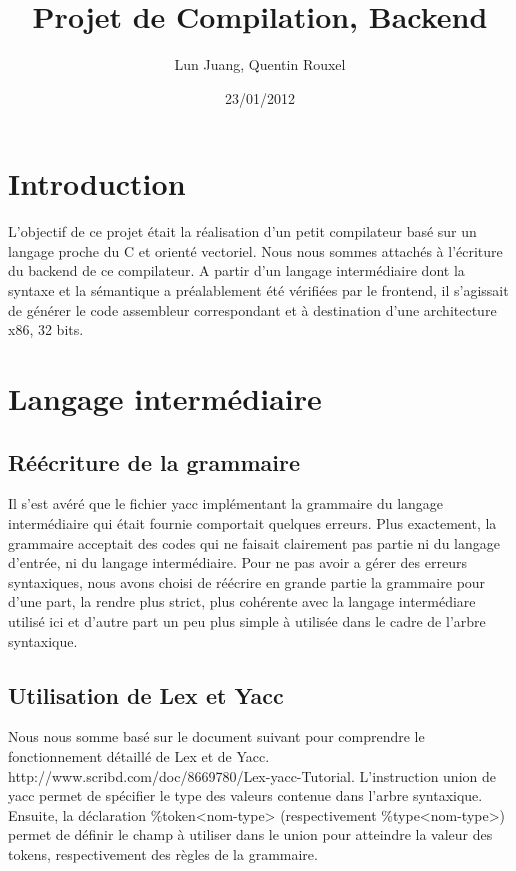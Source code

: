 \documentclass[a4paper, 11pt]{article}
\title{Projet de Compilation, Backend}
\author{Lun Juang, Quentin Rouxel}
\date{23/01/2012}
\begin{document}
\maketitle{}

\section{Introduction}

L'objectif de ce projet était la réalisation d'un petit compilateur basé sur un langage proche du C et orienté vectoriel.
Nous nous sommes attachés à l'écriture du backend de ce compilateur. A partir d'un langage intermédiaire dont la syntaxe et la sémantique
a préalablement été vérifiées par le frontend, il s'agissait de générer le code assembleur correspondant et à destination d'une architecture
x86, 32 bits.

\section{Langage intermédiaire}

\subsection{Réécriture de la grammaire}

Il s'est avéré que le fichier yacc implémentant la grammaire du langage intermédiaire qui était fournie comportait quelques erreurs.
Plus exactement, la grammaire acceptait des codes qui ne faisait clairement pas partie ni du langage d'entrée, ni du langage intermédiaire.
Pour ne pas avoir a gérer des erreurs syntaxiques, nous avons choisi de réécrire en grande partie la grammaire 
pour d'une part, la rendre plus strict, plus cohérente avec la langage intermédiare utilisé ici et d'autre part un peu plus simple à
utilisée dans le cadre de l'arbre syntaxique.

\subsection{Utilisation de Lex et Yacc}

Nous nous somme basé sur le document suivant pour comprendre le fonctionnement détaillé de Lex et de Yacc. 
http://www.scribd.com/doc/8669780/Lex-yacc-Tutorial.
L'instruction union de yacc permet de spécifier le type des valeurs contenue dans l'arbre syntaxique. Ensuite, la déclaration
\%token<nom-type> (respectivement \%type<nom-type>) permet de définir le champ à utiliser dans le union pour atteindre la valeur des tokens, 
respectivement des règles de la grammaire.
\end{document}
